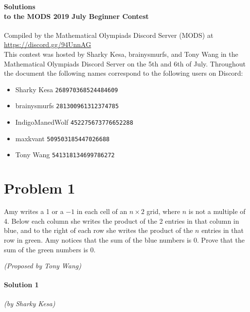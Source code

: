\documentclass[10pt]{article}
\begin{document}
		\setcounter{section}{0}
		\noindent \huge\textbf{Solutions}\vspace{2pt}\\
		\noindent \large\textbf{to the MODS 2019 July Beginner Contest} \vspace{3pt}\\
		\noindent \makebox[\linewidth]{\rule{\textwidth}{0.4pt}}\\
	
		\noindent \normalsize Compiled by the Mathematical Olympiads Discord Server (MODS) at \url{https://discord.gg/94UnnAG}\\
		
		\noindent This contest was hosted by Sharky Kesa, brainysmurfs, and Tony Wang in the Mathematical Olympiads Discord Server on the 5th and 6th of July. Throughout the document the following names correspond to the following users on Discord:
		\begin{itemize}[noitemsep]
		\item Sharky Kesa \tabto*{100pt}\texttt{268970368524484609}
		\item brainysmurfs \tabto*{100pt}\texttt{281300961312374785}
		\item IndigoManedWolf \tabto*{100pt}\texttt{452275673776652288}
		\item maxkvant \tabto*{100pt}\texttt{509503185447026688}
		\item Tony Wang \tabto*{100pt}\texttt{541318134699786272}
		\end{itemize}
		
		
	\newpage		
			
	\section*{Problem 1}
	
	Amy writes a 1 or a \(-1\) in each cell of an \(n \times 2\) grid, where \(n\) is not a multiple of 4. Below each column she writes the product of the 2 entries in that column in blue, and to the right of each row she writes the product of the \(n\) entries in that row in green. Amy notices that the sum of the blue numbers is 0. Prove that the sum of the green numbers is 0.
	\begin{flushright}
	\textit{(Proposed by Tony Wang)}
	\end{flushright}
	
		{\centering \noindent \makebox[\linewidth]{\rule{\textwidth}{0.4pt}}}
	
	\paragraph{Solution 1} \textit{(by Sharky Kesa)}\\
	
\end{document}
